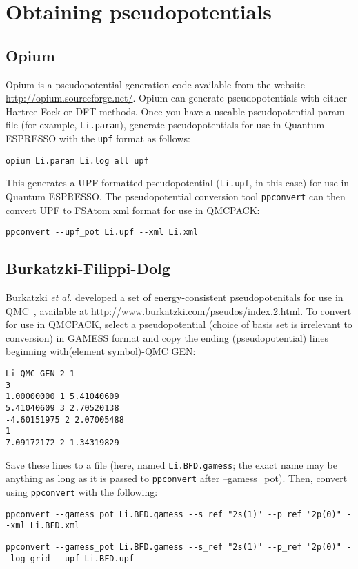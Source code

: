 \section{Obtaining pseudopotentials}

\subsection{Opium}
\label{subsec:opium}

Opium is a pseudopotential generation code available from the website \url{http://opium.sourceforge.net/}.  Opium can generate pseudopotentials with either Hartree-Fock or DFT methods.  Once you have a useable pseudopotential param file (for example, \texttt{Li.param}), generate pseudopotentials for use in Quantum ESPRESSO with the \texttt{upf} format as follows:
\begin{lstlisting}[caption=Generate UPF-formatted pseudopotential with Opium]
opium Li.param Li.log all upf
\end{lstlisting}
This generates a UPF-formatted pseudopotential (\texttt{Li.upf}, in this case) for use in Quantum ESPRESSO.  The pseudopotential conversion tool \texttt{ppconvert} can then convert UPF to FSAtom xml format for use in QMCPACK:
\begin{lstlisting}[caption=Convert UPF-formatted pseudopotential to FSAtom xml format]
ppconvert --upf_pot Li.upf --xml Li.xml
\end{lstlisting}

\subsection{Burkatzki-Filippi-Dolg}
\label{subsec:BFD}

Burkatzki \textit{et al.} developed a set of energy-consistent pseudopotenitals for use in QMC~\cite{Burkatzki07,Burkatzki08}, available at \url{http://www.burkatzki.com/pseudos/index.2.html}.  To convert for use in QMCPACK, select a pseudopotential (choice of basis set is irrelevant to conversion) in GAMESS format and copy the ending (pseudopotential) lines beginning with(element symbol)-QMC GEN:

\begin{lstlisting}[caption=BFD Li pseudopotential in GAMESS format]
Li-QMC GEN 2 1
3
1.00000000 1 5.41040609
5.41040609 3 2.70520138
-4.60151975 2 2.07005488
1
7.09172172 2 1.34319829
\end{lstlisting}
Save these lines to a file (here, named \texttt{Li.BFD.gamess}; the exact name may be anything as long as it is passed to \texttt{ppconvert} after --gamess\_pot).  Then, convert using \texttt{ppconvert} with the following:
\begin{lstlisting}[caption=Convert GAMESS-formatted pseudopotential to FSAtom xml format]
  ppconvert --gamess_pot Li.BFD.gamess --s_ref "2s(1)" --p_ref "2p(0)" --xml Li.BFD.xml
\end{lstlisting}
\begin{lstlisting}[caption=Convert GAMESS-formatted pseudopotential to Quantum ESPRESSO UPF format]
  ppconvert --gamess_pot Li.BFD.gamess --s_ref "2s(1)" --p_ref "2p(0)" --log_grid --upf Li.BFD.upf
\end{lstlisting}

